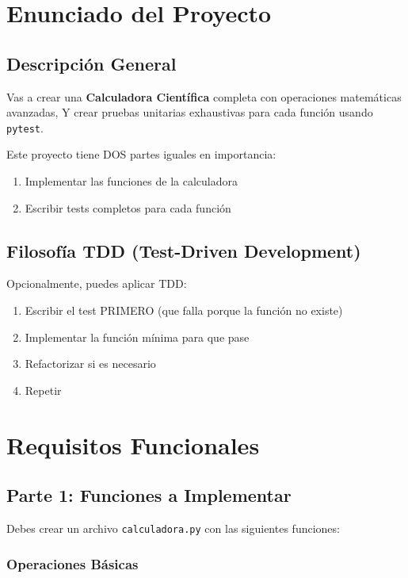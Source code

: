 \documentclass[12pt,a4paper]{article}
\begin{document}
\section{Enunciado del Proyecto}

\subsection{Descripción General}

Vas a crear una \textbf{Calculadora Científica} completa con operaciones matemáticas avanzadas, Y crear pruebas unitarias exhaustivas para cada función usando \texttt{pytest}.

Este proyecto tiene DOS partes iguales en importancia:
\begin{enumerate}
    \item Implementar las funciones de la calculadora
    \item Escribir tests completos para cada función
\end{enumerate}

\subsection{Filosofía TDD (Test-Driven Development)}

Opcionalmente, puedes aplicar TDD:
\begin{enumerate}
    \item Escribir el test PRIMERO (que falla porque la función no existe)
    \item Implementar la función mínima para que pase
    \item Refactorizar si es necesario
    \item Repetir
\end{enumerate}

\section{Requisitos Funcionales}

\subsection{Parte 1: Funciones a Implementar}

Debes crear un archivo \texttt{calculadora.py} con las siguientes funciones:

\subsubsection{Operaciones Básicas}
\end{document}
